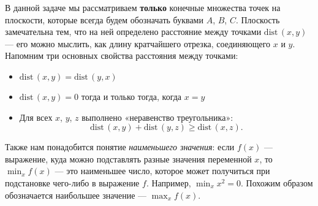 ﻿
\def\dist{\mathrm{dist}\,} \def\l#1{\limits_{#1}}
\def\Dist{\mathrm{DIST}\,}

\vspace{-0.2cm} 

\ms В данной задаче мы рассматриваем {\bf только} конечные множества точек на плоскости, которые всегда будем обозначать буквами $A$, $B$, $C$. Плоскость замечательна тем, что на ней определено расстояние между точками $\dist (x,y)$ — его можно мыслить, как длину кратчайшего отрезка, соединяющего $x$ и $y$. Напомним три основных свойства расстояния между точками:

\vspace{-0.15cm}
\begin{itemize}
	\item $\dist (x,y) = \dist (y,x)$\scolon
	\item $\dist (x,y) = 0$ тогда и только тогда, когда $x=y$\scolon
	\item Для всех $x$, $y$, $z$ выполнено «неравенство треугольника»:
		\vspace{-0.2cm} $$\dist (x,y) + \dist (y,z) \geq \dist (x,z).$$
\end{itemize}

\vspace{-0.4cm}
\ms Также нам понадобится понятие {\it наименьшего значения}: если $f(x)$ — выражение, куда можно подставлять разные значения переменной $x$, то $\min_x f(x)$ — это наименьшее число, которое может получиться при подстановке чего-либо в выражение $f$. Например, $\min_x x^2 = 0$. Похожим образом обозначается наибольшее значение — $\max_x f(x)$.

